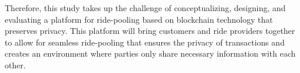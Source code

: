 Therefore, this study takes up the challenge of conceptualizing, designing, and evaluating a platform for ride-pooling based on blockchain technology that preserves privacy. This platform will bring customers and ride providers together to allow for seamless ride-pooling that ensures the privacy of transactions and creates an environment where parties only share necessary information with each other.





